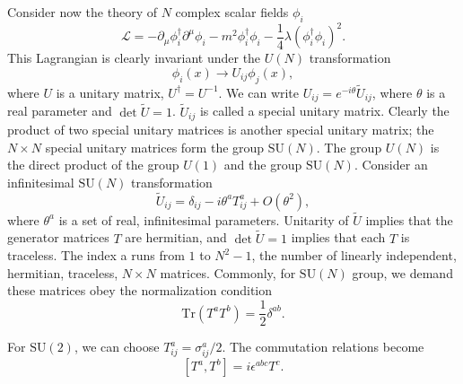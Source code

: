 \noindent
Consider now the theory of $N$ complex scalar fields $\phi_i$
\[\mathcal{L} = -\partial_{\mu}\phi^{\dagger}_i \partial^{\mu}\phi_i - m^2\phi_i^{\dagger}\phi_i - \frac{1}{4}\lambda(\phi_i^{\dagger}\phi_i)^2.\]
This Lagrangian is clearly invariant under the $U(N)$ transformation
\[\phi_i(x) \to U_{ij}\phi_j(x),\]
where $U$ is a unitary matrix, $U^{\dagger} = U^{-1}$. We can write $U_{ij} = e^{-i\theta} \widetilde{U}_{ij}$, where $\theta$ is a real parameter and $\det \widetilde{U} = 1$.
$\widetilde{U}_{ij}$ is called a special unitary matrix.
Clearly the product of two special unitary matrices is another special unitary matrix; the $N \times N$ special unitary matrices form the group $\mathrm{SU}(N)$. 
The group $U(N)$ is the direct product of the group $U(1)$ and the group $\mathrm{SU}(N)$.
Consider an infinitesimal $\mathrm{SU}(N)$ transformation
\[\widetilde{U}_{ij} = \delta_{ij} - i\theta^aT^a_{ij} + O(\theta^2),\]
where $\theta^a$ is a set of real, infinitesimal parameters. Unitarity of $\widetilde{U}$ implies that the generator matrices $T$ are hermitian, and $\det \widetilde{U} = 1$ implies that each $T$ is traceless.
The index a runs from $1$ to $N^2 - 1$, the number of linearly independent, hermitian, traceless, $N \times N$ matrices. Commonly, for $\mathrm{SU}(N)$ group, we demand these matrices obey the normalization condition
\[\mathrm{Tr}(T^a T^b) =\frac{1}{2}\delta^{ab}.\]

\begin{example}
For $\mathrm{SU}(2)$, we can choose $T^a_{ij} = \sigma^a_{ij}/2$. The commutation relations become
\[[T^a,T^b] = i\epsilon^{abc}T^c.\]
\end{example}


